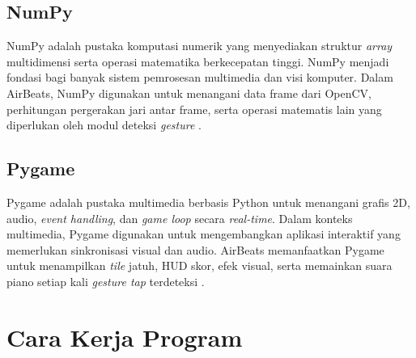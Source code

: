 \documentclass[12pt,a4paper]{article}
\begin{document}
\subsection{NumPy}

NumPy adalah pustaka komputasi numerik yang menyediakan struktur \textit{array} multidimensi serta operasi matematika berkecepatan tinggi. NumPy menjadi fondasi bagi banyak sistem pemrosesan multimedia dan visi komputer. Dalam AirBeats, NumPy digunakan untuk menangani data frame dari OpenCV, perhitungan pergerakan jari antar frame, serta operasi matematis lain yang diperlukan oleh modul deteksi \textit{gesture} \cite{numpy}.

\subsection{Pygame}

Pygame adalah pustaka multimedia berbasis Python untuk menangani grafis 2D, audio, \textit{event handling}, dan \textit{game loop} secara \textit{real-time}. Dalam konteks multimedia, Pygame digunakan untuk mengembangkan aplikasi interaktif yang memerlukan sinkronisasi visual dan audio. AirBeats memanfaatkan Pygame untuk menampilkan \textit{tile} jatuh, HUD skor, efek visual, serta memainkan suara piano setiap kali \textit{gesture tap} terdeteksi \cite{pygame}.

\section{Cara Kerja Program}
\end{document}
